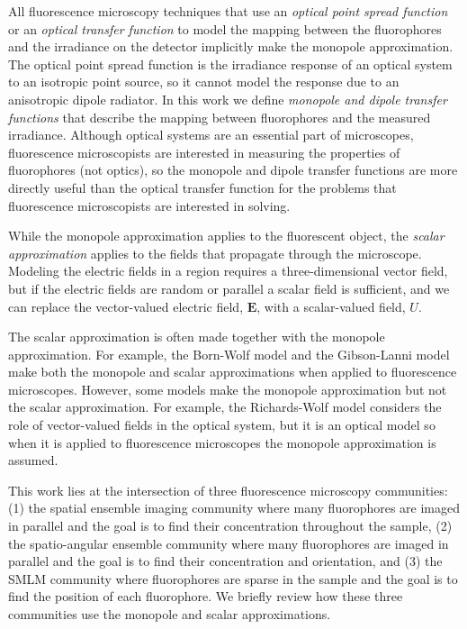 \documentclass[]{osa-article}
\providecommand{\mb}[1]{\mathbf{#1}}
\begin{document}
All fluorescence microscopy techniques that use an \textit{optical point spread
  function} or an \textit{optical transfer function} to model the mapping
between the fluorophores and the irradiance on the detector implicitly make the
monopole approximation. The optical point spread function is the irradiance
response of an optical system to an isotropic point source, so it cannot model
the response due to an anisotropic dipole radiator. In this work we define
\textit{monopole and dipole transfer functions} that describe the mapping
between fluorophores and the measured irradiance. Although optical systems are
an essential part of microscopes, fluorescence microscopists are interested in
measuring the properties of fluorophores (not optics), so the monopole and
dipole transfer functions are more directly useful than the optical transfer
function for the problems that fluorescence microscopists are interested in
solving.

While the monopole approximation applies to the fluorescent object, the
\textit{scalar approximation} applies to the fields that propagate through the
microscope. Modeling the electric fields in a region requires a
three-dimensional vector field, but if the electric fields are random or
parallel a scalar field is sufficient, and we can replace the vector-valued electric
field, $\mb{E}$, with a scalar-valued field, $U$.%

The scalar approximation is often made together with the monopole approximation.
For example, the Born-Wolf model \cite{born1980} and the Gibson-Lanni model
\cite{gibson89} make both the monopole and scalar approximations when applied to
fluorescence microscopes. However, some models make the monopole approximation
but not the scalar approximation. For example, the Richards-Wolf model
\cite{richards} considers the role of vector-valued fields in the optical
system, but it is an optical model so when it is applied to fluorescence
microscopes the monopole approximation is assumed. %

This work lies at the intersection of three fluorescence microscopy communities:
(1) the spatial ensemble imaging community where many fluorophores are imaged in
parallel and the goal is to find their concentration throughout the sample, (2)
the spatio-angular ensemble community where many fluorophores are imaged in
parallel and the goal is to find their concentration and orientation, and (3)
the SMLM community where fluorophores are sparse in the sample and the goal is
to find the position of each fluorophore. We briefly review how these three
communities use the monopole and scalar approximations.
\end{document}
